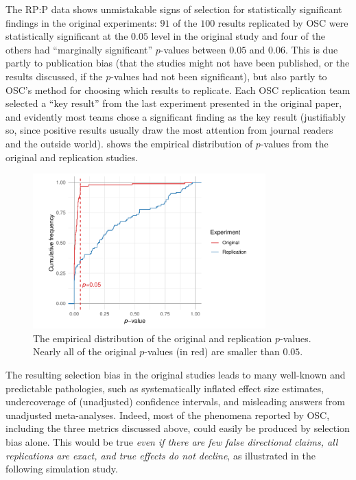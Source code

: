 \documentclass[11pt]{article}
\theoremstyle{definition}
\theoremstyle{custom}
\begin{document}
  The RP:P data shows unmistakable signs of selection for statistically significant findings in the original experiments: $91$ of the $100$ results replicated by OSC were statistically significant at the $0.05$ level in the original study and four of the others had ``marginally significant'' $p$-values between $0.05$ and $0.06$. This is due partly to publication bias (that the studies might not have been published, or the results discussed, if the $p$-values had not been significant), but also partly to OSC's method for choosing which results to replicate. Each OSC replication team selected a ``key result'' from the last experiment presented in the original paper, and evidently most teams chose a significant finding as the key result (justifiably so, since positive results usually draw the most attention from journal readers and the outside world).  shows the empirical distribution of $p$-values from the original and replication studies.
  \begin{figure}[htbp]
    \centering
    \includegraphics[width=0.8\textwidth]{ecdf}
    \caption{The empirical distribution of the original and replication $p$-values. Nearly all of the original $p$-values (in red) are smaller than $0.05$.}
  \label{fig:pval-dist}
  \end{figure}

  The resulting selection bias in the original studies leads to many well-known and predictable pathologies, such as systematically inflated effect size estimates, undercoverage of (unadjusted) confidence intervals, and misleading answers from unadjusted meta-analyses. Indeed, most of the phenomena reported by OSC, including the three metrics discussed above, could easily be produced by selection bias alone. This would be true {\em even if there are few false directional claims, all replications are exact, and true effects do not decline}, as illustrated in the following simulation study.
  
\end{document}
